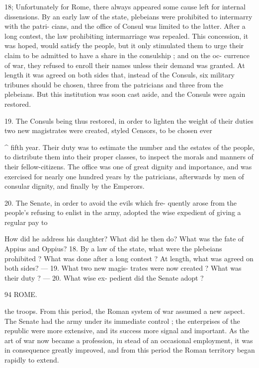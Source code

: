 \documentclass[openany,a4paper]{memoir}
\begin{document}
{18; Unfortunately for Rome, there always appeared some 
cause left for internal dissensions. By an early law of the 
state, plebeians were prohibited to intermarry with the patri- 
cians, and the office of Consul was limited to the latter. 
After a long contest, the law prohibiting intermarriage was 
repealed. This concession, it was hoped, would satisfy the 
people, but it only stimulated them to urge their claim to be 
admitted to have a share in the consulship ; and on the oc- 
currence of war, they refused to enroll their names unless 
their demand was granted. At length it was agreed on both 
sides that, instead of the Consuls, six military tribunes 
should be chosen, three from the patricians and three from 
the plebeians. But this institution was soon cast aside, and 
the Consuls were again restored. 

19. The Consuls being thus restored, in order to lighten 
the weight of their duties two new magistrates were created, 
styled Censors, to be chosen ever}^ fifth year. Their duty 
was to estimate the number and the estates of the people, to 
distribute them into their proper classes, to inspect the morals 
and manners of their fellow-citizens. The office was one of 
great dignity and importance, and was exercised for nearly 
one hundred years by the patricians, afterwards by men of 
consular dignity, and finally by the Emperors. 

20. The Senate, in order to avoid the evils which fre- 
quently arose from the people's refusing to enlist in the 
army, adopted the wise expedient of giving a regular pay to 

How did he address his daughter? What did he then do? What 
was the fate of Appius and Oppius? 18. By a law of the state, what 
were the plebeians prohibited ? What was done after a long contest ? 
At length, what was agreed on both sides? — 19. What two new magis- 
trates were now created ? What was their duty ? — 20. What wise ex- 
pedient did the Senate adopt ? 



94 ROME. 

the troops. From this period, the Roman system of war 
assumed a new aspect. The Senate had the army under its 
immediate control ; the enterprises of the republic were more 
extensive, and its success more signal and important. As the 
art of war now became a profession, iu stead of an occasional 
employment, it was in consequence greatly improved, and 
from this period the Roman territory began rapidly to extend. 
\end{document}
